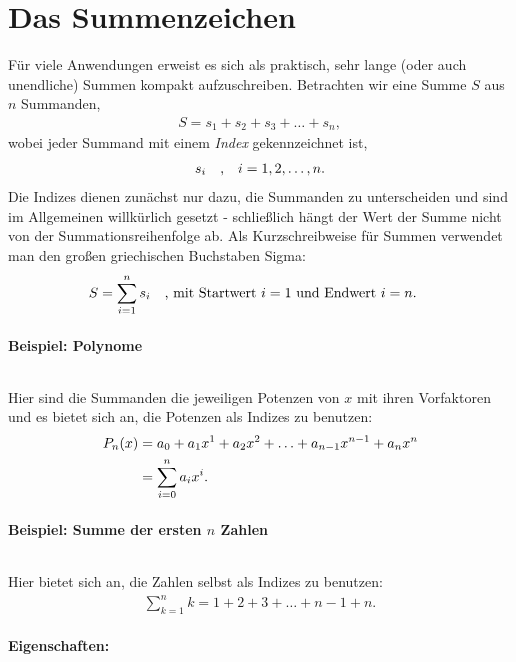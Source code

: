\section{Das Summenzeichen}

Für viele Anwendungen erweist es sich als praktisch, sehr lange (oder auch unendliche) Summen kompakt aufzuschreiben. Betrachten wir eine Summe $S$ aus $n$ Summanden, 
\begin{align}
    S = s_1 + s_2 + s_3 + \hdots + s_n,
\end{align}
wobei jeder Summand mit einem \emph{Index} gekennzeichnet ist, 
\begin{align}
    s_i \qq{,} i=1,2,\hdots,n.
\end{align}
Die Indizes dienen zunächst nur dazu, die Summanden zu unterscheiden und sind im Allgemeinen willkürlich gesetzt - schließlich hängt der Wert der Summe nicht von der Summationsreihenfolge ab. Als Kurzschreibweise für Summen verwendet man den großen griechischen Buchstaben Sigma:
\begin{align}
    S = \sum_{i=1}^n s_i \qq{, mit Startwert $i=1$ und Endwert $i=n$.} 
\end{align}

\paragraph{Beispiel: Polynome}$~$

Hier sind die Summanden die jeweiligen Potenzen von $x$ mit ihren Vorfaktoren und es bietet sich an, die Potenzen als Indizes zu benutzen: 
\begin{align}
    P_n(x) &= a_0 + a_1 x^1 + a_2 x^2 + \hdots + a_{n-1} x^{n-1} + a_n x^n \notag \\
           &= \sum_{i=0}^n a_i x^i.
\end{align}

\paragraph{Beispiel: Summe der ersten $n$ Zahlen}$~$

Hier bietet sich an, die Zahlen selbst als Indizes zu benutzen: 
\begin{align}
    \sum_{k=1}^n k = 1 + 2 + 3 + \hdots + n-1 +n.
\end{align}

\paragraph{Eigenschaften:}$~$

